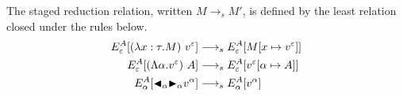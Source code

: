 \begin{definition}
	The staged reduction relation, written $M \longrightarrow_s M'$, is defined by
	the least relation closed under the rules below.
	\begin{align*}
		E^A_\varepsilon [(\lambda x:\tau.M)\ v^\varepsilon] & \longrightarrow_s E^A_\varepsilon[M[x\mapsto v^\varepsilon]]      \\
		E^A_\varepsilon [(\Lambda\alpha.v^\varepsilon)\ A]  & \longrightarrow_s E^A_\varepsilon[v^\varepsilon[\alpha\mapsto A]] \\
		E^A_\alpha [{\mathop{\blacktriangleleft}}_\alpha {\mathop{\blacktriangleright}}_\alpha v^\alpha]        & \longrightarrow_s E^A_\alpha[v^\alpha]                            \\
	\end{align*}
\end{definition}

